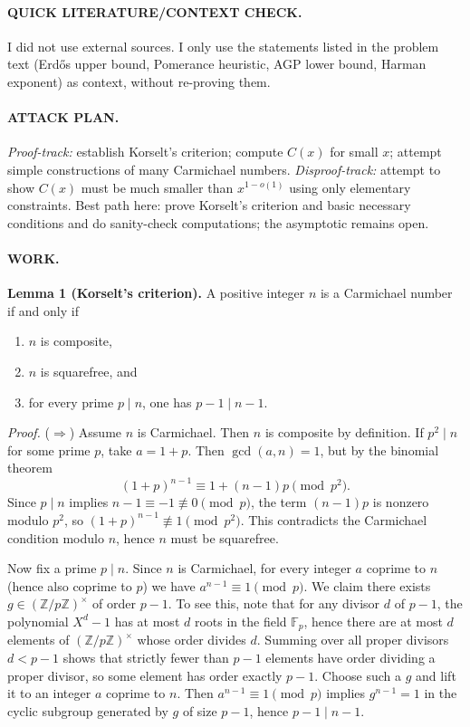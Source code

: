 \paragraph{QUICK LITERATURE/CONTEXT CHECK.}
I did not use external sources. I only use the statements listed in the problem text (Erd\H{o}s upper bound, Pomerance heuristic, AGP lower bound, Harman exponent) as context, without re-proving them.

\paragraph{ATTACK PLAN.}
\emph{Proof-track:} establish Korselt's criterion; compute $C(x)$ for small $x$; attempt simple constructions of many Carmichael numbers.
\emph{Disproof-track:} attempt to show $C(x)$ must be much smaller than $x^{1-o(1)}$ using only elementary constraints.
Best path here: prove Korselt's criterion and basic necessary conditions and do sanity-check computations; the asymptotic remains open.

\paragraph{WORK.}
\textbf{Lemma 1 (Korselt's criterion).}
A positive integer $n$ is a Carmichael number if and only if
\begin{enumerate}
\item $n$ is composite,
\item $n$ is squarefree, and
\item for every prime $p\mid n$, one has $p-1\mid n-1$.
\end{enumerate}

\emph{Proof.}
($\Rightarrow$) Assume $n$ is Carmichael.
Then $n$ is composite by definition.
If $p^2\mid n$ for some prime $p$, take $a=1+p$.
Then $\gcd(a,n)=1$, but by the binomial theorem
\[
(1+p)^{n-1}\equiv 1+(n-1)p \pmod{p^2}.
\]
Since $p\mid n$ implies $n-1\equiv -1\not\equiv 0\pmod p$, the term $(n-1)p$ is nonzero modulo $p^2$, so $(1+p)^{n-1}\not\equiv 1\pmod{p^2}$.
This contradicts the Carmichael condition modulo $n$, hence $n$ must be squarefree.

Now fix a prime $p\mid n$.
Since $n$ is Carmichael, for every integer $a$ coprime to $n$ (hence also coprime to $p$) we have $a^{n-1}\equiv 1\pmod p$.
We claim there exists $g\in(\mathbb{Z}/p\mathbb{Z})^\times$ of order $p-1$.
To see this, note that for any divisor $d$ of $p-1$, the polynomial $X^d-1$ has at most $d$ roots in the field $\mathbb{F}_p$, hence there are at most $d$ elements of $(\mathbb{Z}/p\mathbb{Z})^\times$ whose order divides $d$.
Summing over all proper divisors $d<p-1$ shows that strictly fewer than $p-1$ elements have order dividing a proper divisor, so some element has order exactly $p-1$.
Choose such a $g$ and lift it to an integer $a$ coprime to $n$.
Then $a^{n-1}\equiv 1\pmod p$ implies $g^{n-1}=1$ in the cyclic subgroup generated by $g$ of size $p-1$, hence $p-1\mid n-1$.

